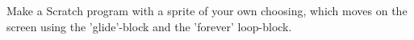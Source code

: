 Make a Scratch program with a sprite of your own choosing, which moves on the screen using the 'glide'-block and the 'forever' loop-block.